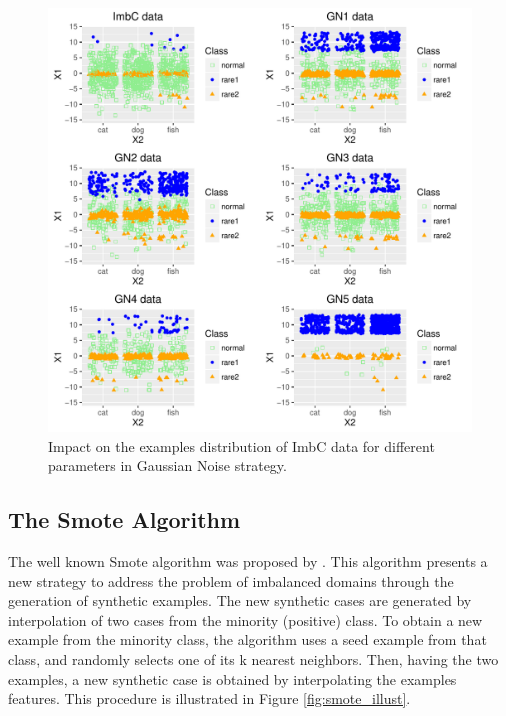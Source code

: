 \documentclass[10pt,a4paper]{article}\usepackage[]{graphicx}\usepackage[]{color}
\makeatletter
\def\maxwidth{ %
  \ifdim\Gin@nat@width>\linewidth
    \linewidth
  \else
    \Gin@nat@width
  \fi
}
\newenvironment{knitrout}{}{} %
\makeatother
\begin{document}
\begin{knitrout}\footnotesize
{}\color{fgcolor}\begin{figure}

{\centering \includegraphics[width=\maxwidth]{figures/UBL-ir_GN_plot2-1} 

}

\caption[Impact on the examples distribution of ImbC data for different parameters in Gaussian Noise strategy]{Impact on the examples distribution of ImbC data for different parameters in Gaussian Noise strategy.}\label{fig:ir_GN_plot2}
\end{figure}


\end{knitrout}

\subsection{The Smote Algorithm}\label{sec:smoteClassif}

The well known Smote algorithm was proposed by \cite{CBOK02}. This algorithm presents a new strategy to address the problem of imbalanced domains through the generation of synthetic examples. The new synthetic cases are generated by interpolation of two cases from the minority (positive) class. To obtain a new example from the minority class, the algorithm uses a seed example from that class, and randomly selects one of its k nearest neighbors. Then, having the two examples, a new synthetic case is obtained by interpolating the examples features. This procedure is illustrated in Figure \ref{fig:smote_illust}.
\end{document}
